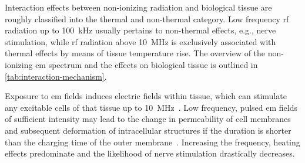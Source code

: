 Interaction effects between non-ionizing radiation and biological tissue are roughly classified into the thermal and non-thermal category.
Low frequency \gls{rf} radiation up to \SI{100}{\kHz} usually pertains to non-thermal effects, e.g., nerve stimulation, while \gls{rf} radiation above \SI{10}{\MHz} is exclusively associated with thermal effects by means of tissue temperature rise.
The overview of the non-ionizing \gls{em} spectrum and the effects on biological tissue is outlined in \cref{tab:interaction-mechanism}.
\begin{table}[ht]
    \centering
    \caption{Summary of non-ionizing radiation effects on biological tissue.}
    \label{tab:interaction-mechanism}
\end{table}
Exposure to \gls{em} fields induces electric fields within tissue, which can stimulate any excitable cells of that tissue up to \SI{10}{\MHz}~\cite{Saunders2007neurobiological}.
Low frequency, pulsed \gls{em} fields of sufficient intensity may lead to the change in permeability of cell membranes and subsequent deformation of intracellular structures if the duration is shorter than the charging time of the outer membrane~\cite{Joshi2010Critical}.
Increasing the frequency, heating effects predominate and the likelihood of nerve stimulation drastically decreases.

